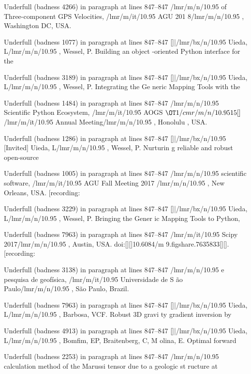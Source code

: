 \documentclass[11pt, a4paper]{article}
\begin{document}
Underfull \hbox (badness 4266) in paragraph at lines 847--847
\TU/lmr/m/n/10.95 of Three-component GPS Velocities, \TU/lmr/m/it/10.95 AGU 201
8\TU/lmr/m/n/10.95 , Washington DC, USA.

Underfull \hbox (badness 1077) in paragraph at lines 847--847
[]|\TU/lmr/bx/n/10.95 Uieda, L\TU/lmr/m/n/10.95 , Wessel, P. Building an object
-oriented Python interface for the

Underfull \hbox (badness 3189) in paragraph at lines 847--847
[]|\TU/lmr/bx/n/10.95 Uieda, L\TU/lmr/m/n/10.95 , Wessel, P. Integrating the Ge
neric Mapping Tools with the

Underfull \hbox (badness 1484) in paragraph at lines 847--847
\TU/lmr/m/n/10.95 Scientific Python Ecosystem, \TU/lmr/m/it/10.95 AOGS $\OT1/cm
r/m/n/10.95 15[]$ \TU/lmr/m/it/10.95 Annual Meeting\TU/lmr/m/n/10.95 , Honolulu
, USA.

Underfull \hbox (badness 1286) in paragraph at lines 847--847
[]|\TU/lmr/bx/n/10.95 [Invited] Uieda, L\TU/lmr/m/n/10.95 , Wessel, P. Nurturin
g reliable and robust open-source

Underfull \hbox (badness 1005) in paragraph at lines 847--847
\TU/lmr/m/n/10.95 scientific software, \TU/lmr/m/it/10.95 AGU Fall Meeting 2017
\TU/lmr/m/n/10.95 , New Orleans, USA. [recording:

Underfull \hbox (badness 3229) in paragraph at lines 847--847
[]|\TU/lmr/bx/n/10.95 Uieda, L\TU/lmr/m/n/10.95 , Wessel, P. Bringing the Gener
ic Mapping Tools to Python,

Underfull \hbox (badness 7963) in paragraph at lines 847--847
\TU/lmr/m/it/10.95 Scipy 2017\TU/lmr/m/n/10.95 , Austin, USA. doi:[][]10.6084/m
9.figshare.7635833[][]. [recording:

Underfull \hbox (badness 3138) in paragraph at lines 847--847
\TU/lmr/m/n/10.95 e pesquisa de geofísica, \TU/lmr/m/it/10.95 Universidade de S
ão Paulo\TU/lmr/m/n/10.95 , São Paulo, Brazil.

Underfull \hbox (badness 7963) in paragraph at lines 847--847
[]|\TU/lmr/bx/n/10.95 Uieda, L\TU/lmr/m/n/10.95 , Barbosa, VCF. Robust 3D gravi
ty gradient inversion by

Underfull \hbox (badness 4913) in paragraph at lines 847--847
[]|\TU/lmr/bx/n/10.95 Uieda, L\TU/lmr/m/n/10.95 , Bomfim, EP, Braitenberg, C, M
olina, E. Optimal forward

Underfull \hbox (badness 2253) in paragraph at lines 847--847
\TU/lmr/m/n/10.95 calculation method of the Marussi tensor due to a geologic st
ructure at
\end{document}
